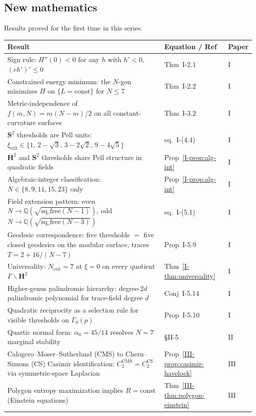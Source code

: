 \subsection{New mathematics}

Results proved for the first time in this series.

\medskip
\begin{tabular}{p{6.5cm}lp{4cm}}
\toprule
Result & Equation / Ref & Paper \\
\midrule
Sign rule: $H''(0) < 0$ for any
  $h$ with $h' < 0$, $(rh')' \le 0$ &
  Thm~I-2.1 & I \\[4pt]
Constrained energy minimum: the $N$-gon
  minimizes $H$ on $\{L = \mathrm{const}\}$
  for $N \le 7$ &
  Thm~I-2.2 & I \\[4pt]
Metric-independence of $f(m,N) = m(N{-}m)/2$
  on all constant-curvature surfaces &
  Thm~I-3.2 & I \\[4pt]
$\mathbf{S}^2$ thresholds are Pell units:
  $\xi_{\mathrm{crit}} \in \{1,\, 2{-}\sqrt{3},\, 3{-}2\sqrt{2},\, 9{-}4\sqrt{5}\}$ &
  eq.~I-(4.4) & I \\[4pt]
$\mathbf{H}^2$ and $\mathbf{S}^2$ thresholds share Pell structure in
  quadratic fields &
  Prop~\ref*{I-prop:alg-int} & I \\[4pt]
Algebraic-integer classification:
  $N \in \{8, 9, 11, 15, 23\}$ only &
  Prop~\ref*{I-prop:alg-int} & I \\[4pt]
Field extension pattern:
  even $N \to \mathbb{Q}(\sqrt{\mathrm{sq\_free}(N{-}1)})$,
  odd $N \to \mathbb{Q}(\sqrt{\mathrm{sq\_free}(N{-}3)})$ &
  eq.~I-(5.1) & I \\[4pt]
Geodesic correspondence: five thresholds
  $=$ five closed geodesics on the modular surface,
  traces $T = 2 + 16/(N{-}7)$ &
  Prop~I-5.9 & I \\[4pt]
Universality: $N_{\mathrm{crit}} = 7$ at $\xi = 0$
  on every quotient $\Gamma\backslash\mathbf{H}^2$ &
  Thm~\ref*{I-thm:universality} & I \\[4pt]
Higher-genus palindromic hierarchy:
  degree-$2d$ palindromic polynomial for
  trace-field degree $d$ &
  Conj~I-5.14 & I \\[4pt]
Quadratic reciprocity as a selection rule
  for visible thresholds on $\Gamma_0(p)$ &
  Prop~I-5.10 & I \\[4pt]
Quartic normal form: $\alpha_0 = 45/14$
  resolves $N = 7$ marginal stability &
  \S II-5 & II \\[4pt]
Calogero--Moser--Sutherland (CMS) to
  Chern--Simons (CS) Casimir identification:
  $C_2^{\mathrm{CMS}} = C_2^{\mathrm{CS}}$ via
  symmetric-space Laplacian &
  Prop~\ref*{III-prop:casimir-havelock} & III \\[4pt]
Polygon entropy maximization implies
  $R = \mathrm{const}$ (Einstein equations) &
  Thm~\ref*{III-thm:polygon-einstein} & III \\[4pt]
\bottomrule
\end{tabular}

